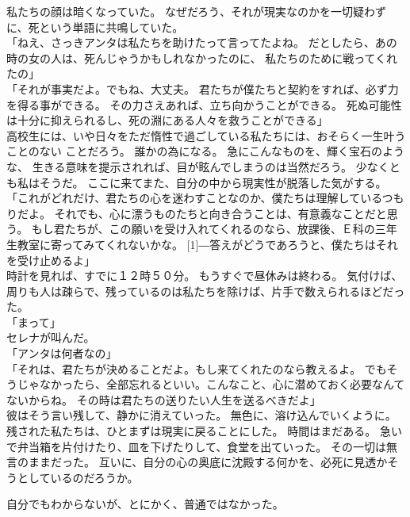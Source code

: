 \documentclass[../IHMain]{subfiles}
\begin{document}
私たちの顔は暗くなっていた。
なぜだろう、それが現実なのかを一切疑わずに、死という単語に共鳴していた。\\
「ねえ、さっきアンタは私たちを助けたって言ってたよね。
だとしたら、あの時の女の人は、死んじゃうかもしれなかったのに、
私たちのために戦ってくれたの」\\
「それが事実だよ。でもね、大丈夫。
君たちが僕たちと契約をすれば、必ず力を得る事ができる。
その力さえあれば、立ち向かうことができる。
死ぬ可能性は十分に抑えられるし、死の淵にある人々を救うことができる」\\
高校生には、いや日々をただ惰性で過ごしている私たちには、おそらく一生叶うことのない
ことだろう。
誰かの為になる。
急にこんなものを、輝く宝石のような、
生きる意味を提示されれば、目が眩んでしまうのは当然だろう。
少なくとも私はそうだ。
ここに来てまた、自分の中から現実性が脱落した気がする。\\
「これがどれだけ、君たちの心を迷わすことなのか、僕たちは理解しているつもりだよ。
それでも、心に漂うものたちと向き合うことは、有意義なことだと思う。
もし君たちが、この願いを受け入れてくれるのなら、放課後、Ｅ科の三年生教室に寄ってみてくれないかな。
\scalebox{3}[1]{―}答えがどうであろうと、僕たちはそれを受け止めるよ」\\
時計を見れば、すでに１２時５０分。
もうすぐで昼休みは終わる。
気付けば、周りも人は疎らで、残っているのは私たちを除けば、片手で数えられるほどだった。\\
「まって」\\
セレナが叫んだ。\\
「アンタは何者なの」\\
「それは、君たちが決めることだよ。もし来てくれたのなら教えるよ。
でもそうじゃなかったら、全部忘れるといい。こんなこと、心に潜めておく必要なんてないからね。
その時は君たちの送りたい人生を送るべきだよ」\\
彼はそう言い残して、静かに消えていった。
無色に、溶け込んでいくように。\\

残された私たちは、ひとまずは現実に戻ることにした。
時間はまだある。
急いで弁当箱を片付けたり、皿を下げたりして、食堂を出ていった。
その一切は無言のままだった。
互いに、自分の心の奥底に沈殿する何かを、必死に見透かそうとしているのだろうか。

自分でもわからないが、とにかく、普通ではなかった。

\section{}
\end{document}
